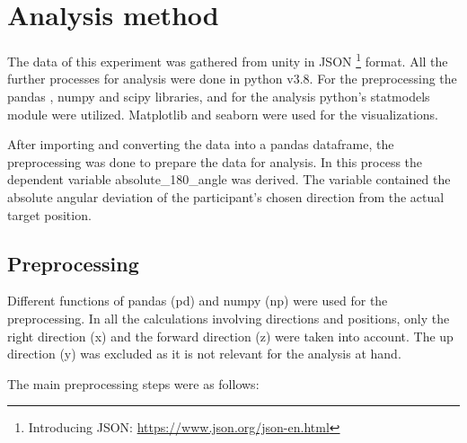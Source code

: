 \section{Analysis method}

The data of this experiment was gathered from unity in JSON \footnote{Introducing JSON: \href{https://www.json.org/json-en.html}{https://www.json.org/json-en.html}} format. All the further processes for analysis were done in python \autocite{10.5555/1593511} v3.8. For the preprocessing the pandas \autocite{reback2022pandas, mckinney-proc-scipy-2010}, numpy \autocite{harris2020array} and scipy \autocite{2020SciPy-NMeth} libraries, and for the analysis python's statmodels \autocite{seabold2010statsmodels} module were utilized. Matplotlib \autocite{Hunter:2007} and seaborn \autocite{Waskom2021} were used for the visualizations.

After importing and converting the data into a pandas dataframe, the preprocessing was done to prepare the data for analysis. In this process the dependent variable {\emphasize absolute\_180\_angle} was derived. The variable contained the absolute angular deviation of the participant's chosen direction from the actual target position. 

\subsection{Preprocessing}

Different functions of pandas {\emphasize (pd)} and numpy {\emphasize (np)} were used for the preprocessing. In all the calculations involving directions and positions, only the right direction (x) and the forward direction (z) were taken into account. The up direction (y) was excluded as it is not relevant for the analysis at hand. 

The main preprocessing steps were as follows:


